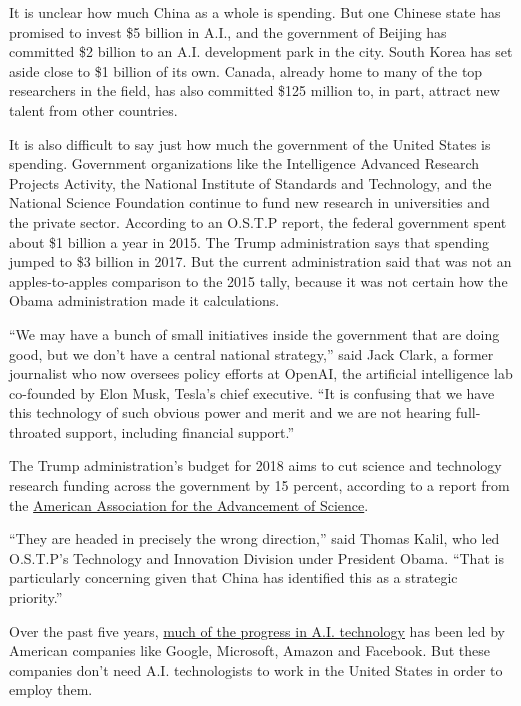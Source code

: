 It is unclear how much China as a whole is spending. But one Chinese
state has promised to invest \$5 billion in A.I., and the government of
Beijing has committed \$2 billion to an A.I. development park in the
city. South Korea has set aside close to \$1 billion of its own. Canada,
already home to many of the top researchers in the field, has also
committed \$125 million to, in part, attract new talent from other
countries.

It is also difficult to say just how much the government of the United
States is spending. Government organizations like the Intelligence
Advanced Research Projects Activity, the National Institute of Standards
and Technology, and the National Science Foundation continue to fund new
research in universities and the private sector. According to an O.S.T.P
report, the federal government spent about \$1 billion a year in 2015.
The Trump administration says that spending jumped to \$3 billion in
2017. But the current administration said that was not an
apples-to-apples comparison to the 2015 tally, because it was not
certain how the Obama administration made it calculations.

``We may have a bunch of small initiatives inside the government that
are doing good, but we don't have a central national strategy,'' said
Jack Clark, a former journalist who now oversees policy efforts at
OpenAI, the artificial intelligence lab co-founded by Elon Musk, Tesla's
chief executive. ``It is confusing that we have this technology of such
obvious power and merit and we are not hearing full-throated support,
including financial support.''

The Trump administration's budget for 2018 aims to cut science and
technology research funding across the government by 15 percent,
according to a report from the
\href{https://www.aaas.org/page/fy-2018-rd-appropriations-dashboard}{American
Association for the Advancement of Science}.

``They are headed in precisely the wrong direction,'' said Thomas Kalil,
who led O.S.T.P's Technology and Innovation Division under President
Obama. ``That is particularly concerning given that China has identified
this as a strategic priority.''

Over the past five years,
\href{https://www.nytimes.com/2017/10/22/technology/artificial-intelligence-experts-salaries.html}{much
of the progress in A.I. technology} has been led by American companies
like Google, Microsoft, Amazon and Facebook. But these companies don't
need A.I. technologists to work in the United States in order to employ
them.

